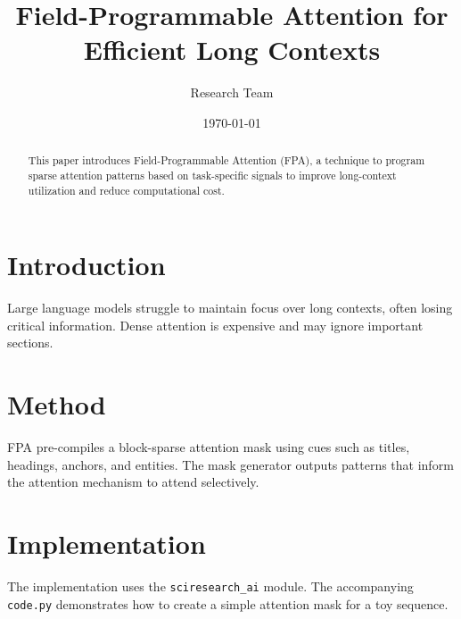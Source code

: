\documentclass{article}
\title{Field-Programmable Attention for Efficient Long Contexts}
\author{Research Team}
\date{\today}
\begin{document}
\maketitle

\begin{abstract}
This paper introduces Field-Programmable Attention (FPA), a technique to
program sparse attention patterns based on task-specific signals to improve
long-context utilization and reduce computational cost.
\end{abstract}

\section{Introduction}
Large language models struggle to maintain focus over long contexts, often
losing critical information. Dense attention is expensive and may ignore
important sections.

\section{Method}
FPA pre-compiles a block-sparse attention mask using cues such as titles,
headings, anchors, and entities. The mask generator outputs patterns that
inform the attention mechanism to attend selectively.

\section{Implementation}
The implementation uses the \texttt{sciresearch\_ai} module. The accompanying
\texttt{code.py} demonstrates how to create a simple attention mask for a toy
sequence.
\end{document}
